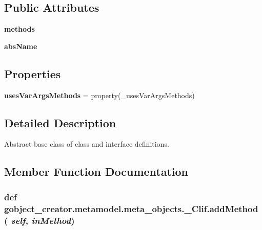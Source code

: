 \subsection*{Public Attributes}
\begin{DoxyCompactItemize}
\item 
\hypertarget{classgobject__creator_1_1metamodel_1_1meta__objects_1_1__Clif_a76603855a5152bc5ab1b72d85d4e1760}{
{\bfseries methods}}
\label{classgobject__creator_1_1metamodel_1_1meta__objects_1_1__Clif_a76603855a5152bc5ab1b72d85d4e1760}

\item 
\hypertarget{classgobject__creator_1_1metamodel_1_1meta__objects_1_1__Clif_a85ea3c27f0f07b8c13f3cd0afec31239}{
{\bfseries absName}}
\label{classgobject__creator_1_1metamodel_1_1meta__objects_1_1__Clif_a85ea3c27f0f07b8c13f3cd0afec31239}

\end{DoxyCompactItemize}
\subsection*{Properties}
\begin{DoxyCompactItemize}
\item 
\hypertarget{classgobject__creator_1_1metamodel_1_1meta__objects_1_1__Clif_a48f73a6e28c73b4e94f6d4b49b97f8f0}{
{\bfseries usesVarArgsMethods} = property(\_\-usesVarArgsMethods)}
\label{classgobject__creator_1_1metamodel_1_1meta__objects_1_1__Clif_a48f73a6e28c73b4e94f6d4b49b97f8f0}

\end{DoxyCompactItemize}


\subsection{Detailed Description}
Abstract base class of class and interface definitions. 

\subsection{Member Function Documentation}
\hypertarget{classgobject__creator_1_1metamodel_1_1meta__objects_1_1__Clif_ab86417004a7ff2cdc6da0e125829d6d3}{
\subsubsection[{addMethod}]{\setlength{\rightskip}{0pt plus 5cm}def gobject\_\-creator.metamodel.meta\_\-objects.\_\-Clif.addMethod ( {\em self}, \/   {\em inMethod})}}
\label{classgobject__creator_1_1metamodel_1_1meta__objects_1_1__Clif_ab86417004a7ff2cdc6da0e125829d6d3}



